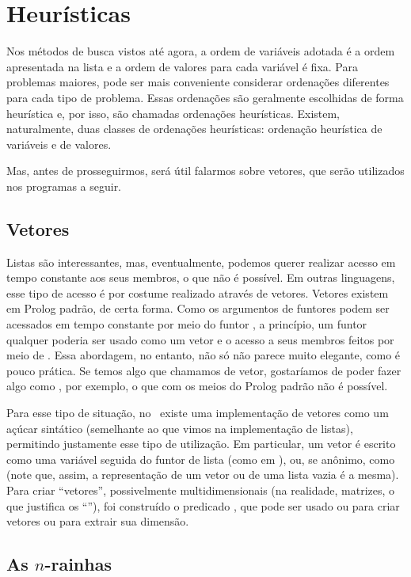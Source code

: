 \documentclass{article}
\begin{document}
\section{Heurísticas}

Nos métodos de busca vistos até agora, a ordem de variáveis adotada é a ordem apresentada na lista
e a ordem de valores para cada variável é fixa. Para problemas maiores, pode ser mais conveniente
considerar ordenações diferentes para cada tipo de problema. Essas ordenações são geralmente
escolhidas de forma heurística e, por isso, são chamadas ordenações heurísticas. Existem,
naturalmente, duas classes de ordenações heurísticas: ordenação heurística de variáveis e de
valores.

Mas, antes de prosseguirmos, será útil falarmos sobre vetores, que serão utilizados nos programas a
seguir.

\subsection{Vetores}

Listas são interessantes, mas, eventualmente, podemos querer realizar acesso em tempo constante aos
seus membros, o que não é possível. Em outras linguagens, esse tipo de acesso é por costume
realizado através de vetores. Vetores existem em Prolog padrão, de certa forma. Como os argumentos
de funtores podem ser acessados em tempo constante por meio do funtor , a princípio,
um funtor qualquer poderia ser usado como um vetor e o acesso a seus membros feitos por meio de
. Essa abordagem, no entanto, não só não parece muito elegante, como é pouco prática.
Se temos algo que chamamos de vetor, gostaríamos de poder fazer algo como , por
exemplo, o que com os meios do Prolog padrão não é possível.

Para esse tipo de situação, no \eclipse\ existe uma implementação de vetores como um açúcar
sintático (semelhante ao que vimos na implementação de listas), permitindo justamente esse tipo de
utilização. Em particular, um vetor é escrito como uma variável seguida do funtor de lista (como
em ), ou, se anônimo, como  (note que, assim, a representação de
um vetor ou de uma lista vazia é a mesma). Para criar ``vetores'', possivelmente multidimensionais
(na realidade, matrizes, o que justifica os ``''), foi construído o predicado , que
pode ser usado ou para criar vetores ou para extrair sua dimensão.

\subsection{As $n$-rainhas}
\end{document}
